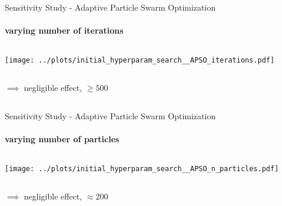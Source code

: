 \documentclass[11pt,aspectratio=169]{beamer}
\begin{document}
\begin{frame}{Sensitivity Study - Adaptive Particle Swarm Optimization}
    \framesubtitle{varying \textbf{number of iterations}}

    \begin{columns}
    \begin{column}{0.8\textwidth}
        \texttt{[image: ../plots/initial\_hyperparam\_search\_\_APSO\_iterations.pdf]}
    \end{column}
    \end{columns}

    \begin{columns}
        \begin{column}{0.8\textwidth}
            $\implies$ negligible effect, $\geq 500$
        \end{column}
        \begin{column}{0.1\textwidth}
            \tiny{}
        \end{column}
    \end{columns}
\end{frame}

%
%

\begin{frame}{Sensitivity Study - Adaptive Particle Swarm Optimization}
    \framesubtitle{varying \textbf{number of particles}}

    \begin{columns}
    \begin{column}{0.8\textwidth}
        \texttt{[image: ../plots/initial\_hyperparam\_search\_\_APSO\_n\_particles.pdf]}
    \end{column}
    \end{columns}

    \begin{columns}
        \begin{column}{0.8\textwidth}
            $\implies$ negligible effect, $\approx 200$
        \end{column}
        \begin{column}{0.1\textwidth}
            \tiny{}
        \end{column}
    \end{columns}
\end{frame}

%
%
\end{document}
